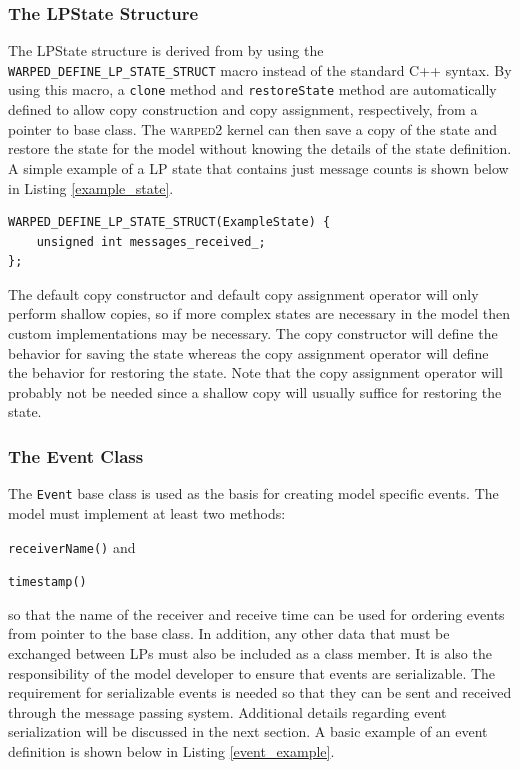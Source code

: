 \documentclass[11pt]{book}
\begin{document}
\subsubsection{The LPState Structure}

The LPState structure is derived from by using the \texttt{WARPED\_DEFINE\_LP\_STATE\_STRUCT} macro
instead of the standard C++ syntax.  By using this macro, a \texttt{clone} method and
\texttt{restoreState} method are automatically defined to allow copy construction and copy
assignment, respectively, from a pointer to base class.  The \textsc{warped2} kernel can then save a
copy of the state and restore the state for the model without knowing the details of the state
definition.  A simple example of a LP state that contains just message counts is shown below in
Listing \ref{example_state}.

\begin{lstlisting}[caption=Example \textsc{warped2} State Definition, label=example_state, float]
WARPED_DEFINE_LP_STATE_STRUCT(ExampleState) {
    unsigned int messages_received_;
};
\end{lstlisting}

The default copy constructor and default copy assignment operator will only perform shallow copies,
so if more complex states are necessary in the model then custom implementations may be necessary.
The copy constructor will define the behavior for saving the state whereas the copy assignment
operator will define the behavior for restoring the state.  Note that the copy assignment operator
will probably not be needed since a shallow copy will usually suffice for restoring the state.

\subsubsection{The Event Class}

The \texttt{Event} base class is used as the basis for creating model specific events.  The model
must implement at least two methods: \begin{inparaenum}[(1)] \item \texttt{receiverName()} and 
\item \texttt{timestamp()} \end{inparaenum} so that the name of the receiver and receive time can be
used for ordering events from pointer to the base class.  In addition, any other data that must be
exchanged between LPs must also be included as a class member.  It is also the responsibility of the
model developer to ensure that events are serializable.  The requirement for serializable events is
needed so that they can be sent and received through the message passing system.  Additional details
regarding event serialization will be discussed in the next section.  A basic example of an event
definition is shown below in Listing \ref{event_example}.
\end{document}

